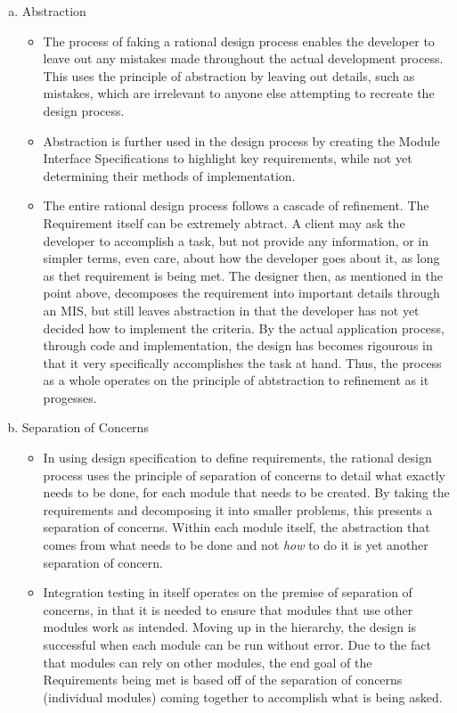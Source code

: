 \documentclass[12pt,fleqn]{examtst}
\begin{document}
\begin{enumerate}[a)]
\item Abstraction
  \begin{itemize}
  \item The process of faking a rational design process enables the developer to leave out any mistakes made throughout the actual development process. This uses the principle of abstraction by leaving out details, such as mistakes, which are irrelevant to anyone else attempting to recreate the design process.
  \item Abstraction is further used in the design process by creating the Module Interface Specifications to highlight key requirements, while not yet determining their methods of implementation. 
  \item The entire rational design process follows a cascade of refinement. The Requirement itself can be extremely abtract. A client may ask the developer to accomplish a task, but not provide any information, or in simpler terms, even care, about how the developer goes about it, as long as thet requirement is being met. The designer then, as mentioned in the point above, decomposes the requirement into important details through an MIS, but still leaves abstraction in that the developer has not yet decided how to implement the criteria. By the actual application process, through code and implementation, the design has becomes rigourous in that it very specifically accomplishes the task at hand. Thus, the process as a whole operates on the principle of abtstraction to refinement as it progesses.
  \end{itemize}
\item Separation of Concerns
  \begin{itemize}
  \item In using design specification to define requirements, the rational design process uses the principle of separation of concerns to detail what exactly needs to be done, for each module that needs to be created. By taking the requirements and decomposing it into smaller problems, this presents a separation of concerns. Within each module itself, the abstraction that comes from what needs to be done and not \emph{how} to do it is yet another separation of concern. 
  \item Integration testing in itself operates on the premise of separation of concerns, in that it is needed to ensure that modules that use other modules work as intended. Moving up in the hierarchy, the design is successful when each module can be run without error. Due to the fact that modules can rely on other modules, the end goal of the Requirements being met is based off of the separation of concerns (individual modules) coming together to accomplish what is being asked.

\end{itemize}
\end{enumerate}
\end{document}
